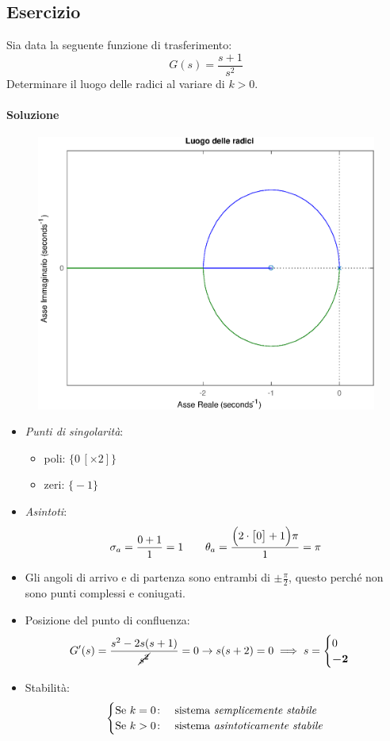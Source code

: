 \subsection{Esercizio}
Sia data la seguente funzione di trasferimento:
\[
	G(s) = \frac{s+1}{s^2}
\]
Determinare il luogo delle radici al variare di \(k > 0\).

\paragraph{Soluzione}

\begin{figure}[ht]
	\centering
	\includegraphics[scale=.6]{mod1/assets/rl_ex32}
\end{figure}

\begin{itemize}
	\item \emph{Punti di singolarità}:
		\begin{itemize}
			\item poli: \(\bigl\{ 0\,[\times 2] \bigr\}\)
			\item zeri: \(\bigl\{ -1 \bigr\}\)
		\end{itemize}
	\item \emph{Asintoti}:
		\[
			\sigma_a = \frac{0+1}{1} = 1 \qquad
			\theta_a = \frac{\Bigl(2\cdot\bigl[0\bigr]+1\Bigr)\pi}{1} = \pi
		\]
	\item Gli angoli di arrivo e di partenza sono entrambi di
		\(\pm \frac{\pi}{2}\), questo perché non sono punti complessi e
		coniugati.
	\item Posizione del punto di confluenza:
		\[
			G^\prime(s) = \frac{s^2 -2s(s+1)}{\cancel{s^2}} = 0
			\rightarrow s(s+2) = 0
			\implies s= \begin{cases} 0 \\ \bm{-2} \end{cases}
		\]
	\item Stabilità:
		\[\begin{cases}
			\text{Se } k = 0\colon & \text{sistema \emph{semplicemente stabile}} \\
			\text{Se } k > 0\colon & \text{sistema \emph{asintoticamente stabile}}
		\end{cases}\]
\end{itemize}


